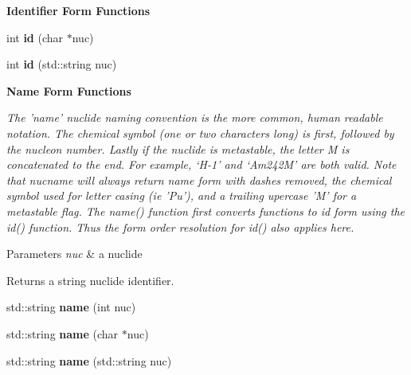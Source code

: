 \begin{Indent}{\bf Identifier Form Functions}
\begin{DoxyCompactItemize}
\item 
\hypertarget{namespacepyne_1_1nucname_abd47ad9bd47f674792742d3e4b115b16}{int {\bfseries id} (char $\ast$nuc)}\label{namespacepyne_1_1nucname_abd47ad9bd47f674792742d3e4b115b16}

\item 
\hypertarget{namespacepyne_1_1nucname_aba028a16fcfaeb10e45bb5218606a17e}{int {\bfseries id} (std\-::string nuc)}\label{namespacepyne_1_1nucname_aba028a16fcfaeb10e45bb5218606a17e}

\end{DoxyCompactItemize}
\end{Indent}
\begin{Indent}{\bf Name Form Functions}\par
{\em The 'name' nuclide naming convention is the more common, human readable notation. The chemical symbol (one or two characters long) is first, followed by the nucleon number. Lastly if the nuclide is metastable, the letter M is concatenated to the end. For example, ‘\-H-\/1’ and ‘\-Am242\-M’ are both valid. Note that nucname will always return name form with dashes removed, the chemical symbol used for letter casing (ie 'Pu'), and a trailing upercase 'M' for a metastable flag. The name() function first converts functions to id form using the id() function. Thus the form order resolution for id() also applies here. 
\begin{DoxyParams}{Parameters}
{\em nuc} & a nuclide \\
\hline
\end{DoxyParams}
\begin{DoxyReturn}{Returns}
a string nuclide identifier. 
\end{DoxyReturn}
}\begin{DoxyCompactItemize}
\item 
\hypertarget{namespacepyne_1_1nucname_a70117a5d74d65b210c635c662e08fe10}{std\-::string {\bfseries name} (int nuc)}\label{namespacepyne_1_1nucname_a70117a5d74d65b210c635c662e08fe10}

\item 
\hypertarget{namespacepyne_1_1nucname_a38fc868c1a343358df2021a151ec03f8}{std\-::string {\bfseries name} (char $\ast$nuc)}\label{namespacepyne_1_1nucname_a38fc868c1a343358df2021a151ec03f8}

\item 
\hypertarget{namespacepyne_1_1nucname_adfcf9a3fc2217ba23e93ce5915bad706}{std\-::string {\bfseries name} (std\-::string nuc)}\label{namespacepyne_1_1nucname_adfcf9a3fc2217ba23e93ce5915bad706}

\end{DoxyCompactItemize}
\end{Indent}
